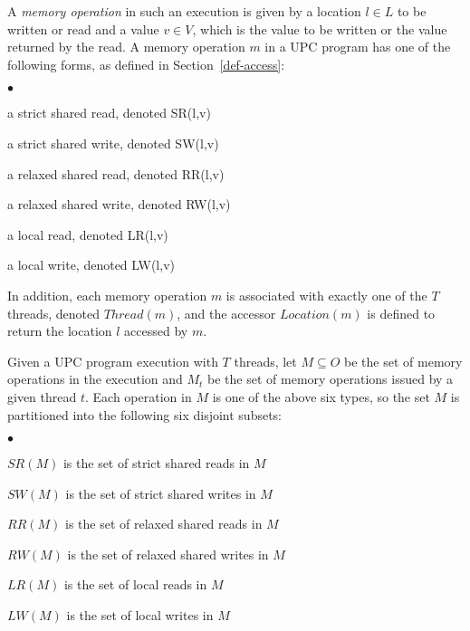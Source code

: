 \np A \emph{memory operation} in such an execution is given by a location $l \in
L$ to be written or read and a value $v \in V$, which is the value to
be written or the value returned by the read.  A memory operation $m$
in a UPC program has one of the following forms, as defined in Section~\ref{def-access}:
\begin{list}{ $\bullet$ }{\setlength{\itemsep}{0pt}}
\item a strict shared read, denoted SR(l,v)
\item a strict shared write, denoted SW(l,v)
\item a relaxed shared read, denoted RR(l,v)
\item a relaxed shared write, denoted RW(l,v)
\item a local read, denoted LR(l,v)
\item a local write, denoted LW(l,v)
\end{list}

\np In addition, each memory operation $m$ is associated with exactly one 
of the $T$ threads, denoted $Thread(m)$, and the accessor $Location(m)$ 
is defined to return the location $l$ accessed by $m$.

\np Given a UPC program execution with $T$ threads, let $M \subseteq O$ be
the set of memory operations in the execution and $M_t$ be the
set of memory operations issued by a given thread $t$.  Each operation
in $M$ is one of the above six types, so the set $M$ is 
partitioned into the following six disjoint subsets:
\begin{list}{ $\bullet$ }{\setlength{\itemsep}{0pt}}
\item $SR(M)$ is the set of strict shared reads in $M$
\item $SW(M)$ is the set of strict shared writes in $M$
\item $RR(M)$ is the set of relaxed shared reads in $M$
\item $RW(M)$ is the set of relaxed shared writes in $M$
\item $LR(M)$ is the set of local reads in $M$
\item $LW(M)$ is the set of local writes in $M$
\end{list}


